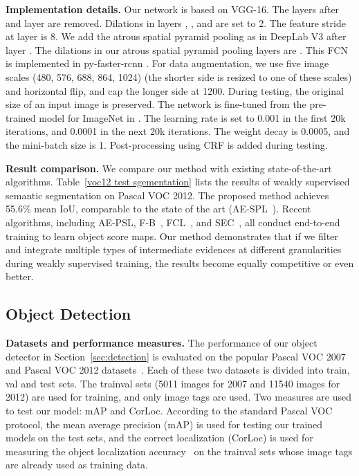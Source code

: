 \documentclass[10pt,twocolumn,letterpaper]{article}
\begin{document}
\noindent\textbf{Implementation details.} Our network is based on VGG-16. The layers after  and layer  are removed. Dilations in layers , , and  are set to 2. The feature stride  at layer  is 8. We add the atrous spatial pyramid pooling as in DeepLab V3 \cite{chen2017rethinking} after layer . The dilations in our atrous spatial pyramid pooling layers are . This FCN is implemented in py-faster-rcnn \cite{renNIPS15fasterrcnn}. For data augmentation, we use five image scales (480, 576, 688, 864, 1024) (the shorter side is resized to one of these scales) and horizontal flip, and cap the longer side at 1200. During testing, the original size of an input image is preserved. The network is fine-tuned from the pre-trained model for ImageNet in \cite{Simonyan14c}. The learning rate  is set to 0.001 in the first 20k iterations, and 0.0001 in the next 20k iterations. The weight decay is 0.0005, and the mini-batch size is 1. Post-processing using CRF \cite{krahenbuhl2011efficient} is added during testing.

\noindent\textbf{Result comparison.} We compare our method with existing state-of-the-art algorithms.
Table~\ref{voc12 test sgementation} lists the results of weakly supervised semantic segmentation on Pascal VOC 2012. The proposed method achieves 55.6\% mean IoU, comparable to the state of the art (AE-SPL~\cite{Wei_2017_CVPR}). Recent algorithms, including AE-PSL\cite{Wei_2017_CVPR}, F-B~\cite{saleh2016built}, FCL~\cite{roy2017combining}, and SEC~\cite{kolesnikov2016seed}, all conduct end-to-end training to learn object score maps. Our method demonstrates that if we filter and integrate multiple types of intermediate evidences at different granularities during weakly supervised training, the results become equally competitive or even better. 

\subsection{Object Detection}\vspace{-2mm}
\noindent\textbf{Datasets and performance measures.} The performance of our object detector in Section~\ref{sec:detection} is evaluated on the popular Pascal VOC 2007 and Pascal VOC 2012 datasets~\cite{everingham2015pascal}. Each of these two datasets is divided into train, val and test sets. The trainval sets (5011 images for 2007 and 11540 images for 2012) are used for training, and only image tags are used. Two measures are used to test our model: mAP and CorLoc. According to the standard Pascal VOC protocol, the mean average precision (mAP) is used for testing our trained models on the test sets, and the correct localization (CorLoc) is used for measuring the object localization accuracy~\cite{deselaers2012weakly} on the trainval sets whose image tags are already used as training data.
\end{document}
